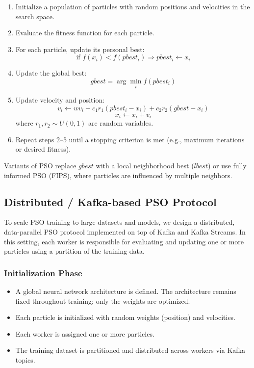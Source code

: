 \begin{enumerate}
    \item Initialize a population of particles with random positions and velocities in the search space.
    \item Evaluate the fitness function for each particle.
    \item For each particle, update its personal best:
    \[
    \text{if } f(x_i) < f(pbest_i) \Rightarrow pbest_i \leftarrow x_i
    \]
    \item Update the global best:
    \[
    gbest = \arg\min_{i} f(pbest_i)
    \]
    \item Update velocity and position:
    \[
    v_i \leftarrow w v_i + c_1 r_1 (pbest_i - x_i) + c_2 r_2 (gbest - x_i)
    \]
    \[
    x_i \leftarrow x_i + v_i
    \]
    where $r_1, r_2 \sim U(0,1)$ are random variables.
    \item Repeat steps 2--5 until a stopping criterion is met (e.g., maximum iterations or desired fitness).
\end{enumerate}

Variants of PSO replace $gbest$ with a local neighborhood best ($lbest$) or use fully informed PSO (FIPS), where particles are influenced by multiple neighbors.

\subsection{Distributed / Kafka-based PSO Protocol}

To scale PSO training to large datasets and models, we design a distributed, data-parallel PSO protocol implemented on top of Kafka and Kafka Streams. In this setting, each worker is responsible for evaluating and updating one or more particles using a partition of the training data.

\subsubsection{Initialization Phase}

\begin{itemize}
    \item A global neural network architecture is defined. The architecture remains fixed throughout training; only the weights are optimized.
    \item Each particle is initialized with random weights (position) and velocities.
    \item Each worker is assigned one or more particles.
    \item The training dataset is partitioned and distributed across workers via Kafka topics.
\end{itemize}

